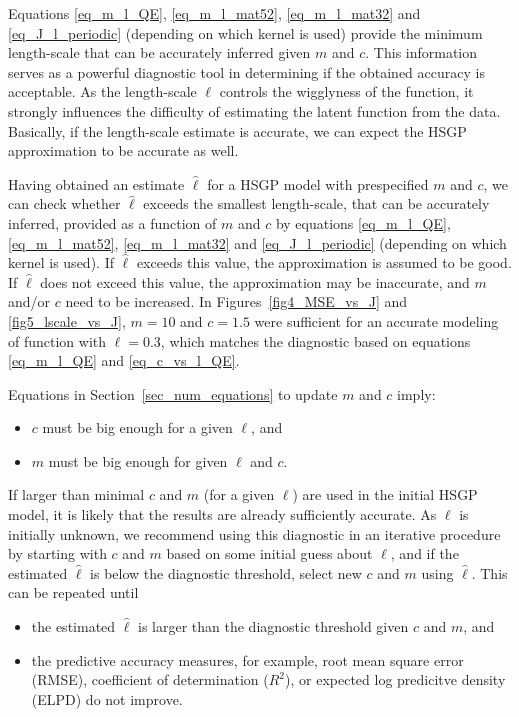 Equations \eqref{eq_m_l_QE}, \eqref{eq_m_l_mat52}, \eqref{eq_m_l_mat32} and \eqref{eq_J_l_periodic} (depending on which kernel is used) provide the minimum length-scale that can be accurately inferred given $m$ and $c$. This information serves as a powerful diagnostic tool in determining if the obtained accuracy is acceptable. As the length-scale $\ell$ controls the wigglyness of the function, it strongly influences the difficulty of estimating the latent function from the data. Basically, if the length-scale estimate is accurate, we can expect the HSGP approximation to be accurate as well.

Having obtained an estimate $\hat{\ell}$ for a HSGP model with prespecified $m$ and $c$, we can check whether $\hat{\ell}$ exceeds the smallest length-scale, that can be accurately inferred, provided as a function of $m$ and $c$ by equations \eqref{eq_m_l_QE}, \eqref{eq_m_l_mat52}, \eqref{eq_m_l_mat32} and \eqref{eq_J_l_periodic} (depending on which kernel is used). If $\hat{\ell}$ exceeds this value, the approximation is assumed to be good. If $\hat{\ell}$ does not exceed this value, the approximation may be inaccurate, and $m$ and/or $c$ need to be increased. In Figures~\ref{fig4_MSE_vs_J} and \ref{fig5_lscale_vs_J}, $m = 10$ and $c = 1.5$ were sufficient for an accurate modeling of function with $\ell = 0.3$, which matches the diagnostic based on equations \eqref{eq_m_l_QE} and \eqref{eq_c_vs_l_QE}.

Equations in Section~\ref{sec_num_equations} to update $m$ and $c$ imply:
% 
\begin{itemize}
	\item $c$ must be big enough for a given $\ell$, and
	\item $m$ must be big enough for given $\ell$ and $c$. 
\end{itemize}
%
If larger than minimal $c$ and $m$ (for a given $\ell$) are used in the initial HSGP model, it is likely that the results are already sufficiently accurate. As $\ell$ is initially unknown, we recommend using this diagnostic in an iterative procedure by starting with $c$ and $m$ based on some initial guess about $\ell$, and if the estimated $\hat{\ell}$ is below the diagnostic threshold, select new $c$ and $m$ using $\hat{\ell}$. This can be repeated until
%
\begin{itemize}
\item the estimated $\hat{\ell}$ is larger than the diagnostic threshold given $c$ and $m$, and
\item the predictive accuracy measures, for example, root mean square error (RMSE), coefficient of determination ($R^2$), or expected log predicitve density (ELPD) do not improve.
\end{itemize}

